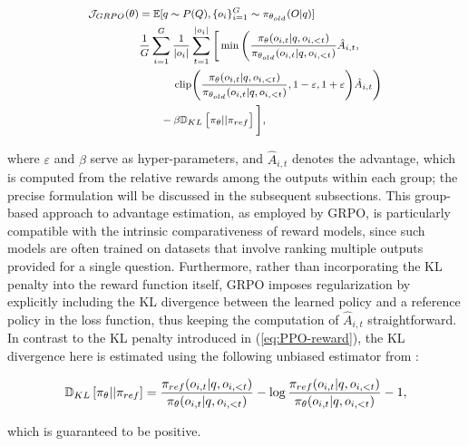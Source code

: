 \begin{itemize}[topsep=0pt]
\begin{equation}
\footnotesize
\begin{split}
    \mathcal{J}_{GRPO}(\theta) &= \mathbb{E}{[q \sim P(Q), \{o_i\}_{i=1}^G \sim \pi_{\theta_{old}}(O|q)]}  \\
    & \frac{1}{G}\sum_{i=1}^G\frac{1}{|o_i|} \sum_{t=1}^{|o_i|} \Bigg[ \min \Bigg( \frac{\pi_\theta(o_{i,t} | q, o_{i,<t})}{\pi_{\theta_{old}}(o_{i,t} | q, o_{i,<t})} \hat{A}_{i,t}, \\
    & \qquad\quad\ \text{clip} \Bigg( \frac{\pi_\theta(o_{i,t} | q, o_{i,<t})}{\pi_{\theta_{old}}(o_{i,t} | q, o_{i,<t})}, 1 - \varepsilon, 1 + \varepsilon \Bigg) \hat{A}_{i,t} \Bigg) \\
    & \qquad - \beta \mathbb{D}_{KL}\left[\pi_{\theta} || \pi_{ref}\right] \Bigg],
\end{split}
\label{eq:GRPO-obj}
\end{equation}

where $\varepsilon$ and $\beta$ serve as hyper-parameters, and $\hat{A}_{i,t}$ denotes the advantage, which is computed from the relative rewards among the outputs within each group; the precise formulation will be discussed in the subsequent subsections. This group-based approach to advantage estimation, as employed by GRPO, is particularly compatible with the intrinsic comparativeness of reward models, since such models are often trained on datasets that involve ranking multiple outputs provided for a single question. Furthermore, rather than incorporating the KL penalty into the reward function itself, GRPO imposes regularization by explicitly including the KL divergence between the learned policy and a reference policy in the loss function, thus keeping the computation of $\hat{A}_{i,t}$ straightforward. In contrast to the KL penalty introduced in (\ref{eq:PPO-reward}), the KL divergence here is estimated using the following unbiased estimator from \citep{kl_approx}:

\begin{equation}
\small
    \mathbb{D}_{KL}\left[\pi_{\theta} || \pi_{ref}\right] = \frac{\pi_{ref}(o_{i,t}|q,o_{i,<t})}{\pi_{\theta}(o_{i,t}|q,o_{i,<t})}- \log\frac{\pi_{ref}(o_{i,t}|q,o_{i,<t})}{\pi_{\theta}(o_{i,t}|q,o_{i,<t})} - 1,
\end{equation}

which is guaranteed to be positive.


\end{itemize}
